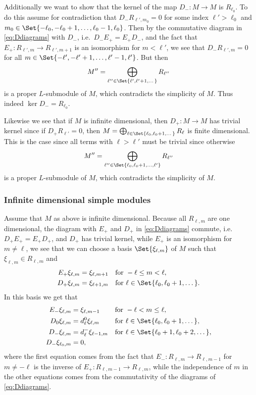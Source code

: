 Additionally we want to show that the kernel of the map $D_-\colon M\to M$ is $R_{\ell_0}$. To do this assume for contradiction that $D_-R_{\ell',m_0}=0$ for some index $\ell'>\ell_0$ and $m_0\in\Set{-\ell_0,-\ell_0+1,\dotsc,\ell_0-1,\ell_0}$. Then by the commutative diagram in \cref{eq:Ddiagrams} with $D_-$, i.e.\ $D_-E_+=E_+D_-$, and the fact that $E_+\colon R_{\ell',m}\to R_{\ell',m+1}$ is an isomorphism for $m<\ell'$, we see that $D_-R_{\ell',m}=0$ for all $m\in\Set{-\ell',-\ell'+1,\dotsc,\ell'-1,\ell'}$. But then
\begin{align*}
  M'' = \bigoplus_{\ell''\in\Set{\ell',\ell'+1,\dotsc}} R_{\ell''}
\end{align*}
is a proper $L$-submodule of $M$, which contradicts the simplicity of $M$. Thus indeed $\ker D_- = R_{\ell_0}$.

Likewise we see that if $M$ is infinite dimensional, then $D_+\colon M\to M$ has trivial kernel since if $D_+R_{\ell'}=0$, then $M=\bigoplus_{\ell\in\Set{\ell_0,\ell_0+1,\dotsc}} R_{\ell}$ is finite dimensional. This is the case since all terms with $\ell>\ell'$ must be trivial since otherwise
\begin{align*}
  M'' = \bigoplus_{\ell''\in\Set{\ell_0,\ell_0+1,\dotsc,\ell'}} R_{\ell''}
\end{align*}
is a proper $L$-submodule of $M$, which contradicts the simplicity of $M$.

\subsubsection{Infinite dimensional simple modules}

Assume that $M$ as above is infinite dimensional. Because all $R_{\ell,m}$ are one dimensional, the diagram with $E_+$ and $D_+$ in \cref{eq:Ddiagrams} commute, i.e.\ $D_+E_+=E_+D_+$, and $D_+$ has trivial kernel, while $E_+$ is an isomorphism for $m\neq \ell$, we see that we can choose a basis $\Set{\xi_{\ell,m}}$ of $M$ such that $\xi_{\ell,m}\in R_{\ell,m}$ and
\begin{align*}
  E_+ \xi_{\ell,m} &= \xi_{\ell,m+1} && \mbox{for }-\ell\leq m<\ell,\\
  D_+ \xi_{\ell,m} &= \xi_{\ell+1,m} && \mbox{for }\ell\in\Set{\ell_0,\ell_0+1,\dotsc}.
\end{align*}
In this basis we get that
\begin{align}\label{eq:EandDnewbasis}
  \begin{aligned}
    E_- \xi_{\ell,m} &= \xi_{\ell,m-1} && \mbox{for }-\ell<m\leq \ell, \\
    D_0 \xi_{\ell,m} &= d_\ell^0 \xi_{\ell,m} && \mbox{for }\ell\in\Set{\ell_0,\ell_0+1,\dotsc},\\
    D_- \xi_{\ell,m} &= d_\ell^- \xi_{\ell-1,m} && \mbox{for }\ell\in\Set{\ell_0+1,\ell_0+2,\dotsc},\\
    D_- \xi_{\ell_0,m} &= 0,
  \end{aligned}
\end{align}
where the first equation comes from the fact that $E_-\colon R_{\ell,m}\to R_{\ell,m-1}$ for $m\neq -\ell$ is the inverse of $E_+\colon R_{\ell,m-1}\to R_{\ell,m}$, while the independence of $m$ in the other equations comes from the commutativity of the diagrams of \cref{eq:Ddiagrams}.

